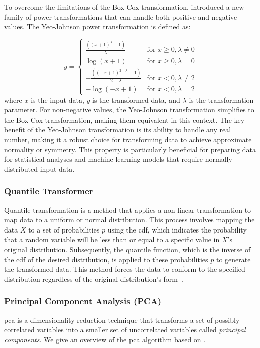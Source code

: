 To overcome the limitations of the Box-Cox transformation, \citet{YeoJohnson} introduced a new family of power transformations that can handle both positive and negative values. 
The Yeo-Johnson power transformation is defined as:

$$ 
y = 
\begin{cases} 
\frac{((x + 1)^\lambda - 1)}{\lambda} & \text{for } x \geq 0, \lambda \neq 0 \\
\log(x + 1) & \text{for } x \geq 0, \lambda = 0 \\
-\frac{((-x + 1)^{2 - \lambda} - 1)}{2 - \lambda} & \text{for } x < 0, \lambda \neq 2 \\
-\log(-x + 1) & \text{for } x < 0, \lambda = 2
\end{cases} 
$$
where $x$ is the input data, $y$ is the transformed data, and $\lambda$ is the transformation parameter.
For non-negative values, the Yeo-Johnson transformation simplifies to the Box-Cox transformation, making them equivalent in this context. 
The key benefit of the Yeo-Johnson transformation is its ability to handle any real number, making it a robust choice for transforming data to achieve approximate normality or symmetry. 
This property is particularly beneficial for preparing data for statistical analyses and machine learning models that require normally distributed input data.

\subsubsection{Quantile Transformer}
Quantile transformation is a method that applies a non-linear transformation to map data to a uniform or normal distribution. 
This process involves mapping the data $X$ to a set of probabilities $p$ using the \gls{cdf}, which indicates the probability that a random variable will be less than or equal to a specific value in $X$'s original distribution. 
Subsequently, the quantile function, which is the inverse of the \gls{cdf} of the desired distribution, is applied to these probabilities $p$ to generate the transformed data. 
This method forces the data to conform to the specified distribution regardless of the original distribution's form~\cite{Vasques2024}.

\subsubsection{Principal Component Analysis (PCA)}\label{subsec:pca}
\gls{pca} is a dimensionality reduction technique that transforms a set of possibly correlated variables into a smaller set of uncorrelated variables called \textit{principal components}.
We give an overview of the \gls{pca} algorithm based on \citet{James2023AnIS}.

